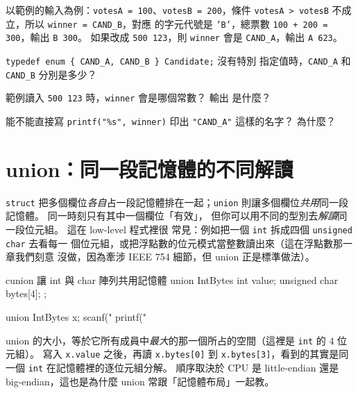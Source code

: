 
以範例的輸入為例：\texttt{votesA = 100}、\texttt{votesB = 200}，條件
\texttt{votesA > votesB} 不成立，所以 \texttt{winner = CAND\_B}，對應
的字元代號是 \texttt{'B'}，總票數 \texttt{100 + 200 = 300}，輸出
\texttt{B 300}。 如果改成 \texttt{500 123}，則 \texttt{winner} 會是
\texttt{CAND\_A}，輸出 \texttt{A 623}。


\begin{drills}[label=drills:ext-enum]
\item \texttt{typedef enum \{ CAND\_A, CAND\_B \} Candidate;} 沒有特別
指定值時，\texttt{CAND\_A} 和 \texttt{CAND\_B} 分別是多少？
\item 範例讀入 \texttt{500 123} 時，\texttt{winner} 會是哪個常數？ 輸出
是什麼？
\item 能不能直接寫 \texttt{printf("\%s", winner)} 印出 \texttt{"CAND\_A"}
這樣的名字？ 為什麼？
\end{drills}

\section{union：同一段記憶體的不同解讀}
\label{sec:ext-union}

\texttt{struct} 把多個欄位\emph{各自}占一段記憶體排在一起；\texttt{union}
則讓多個欄位\emph{共用}同一段記憶體。 同一時刻只有其中一個欄位「有效」，
但你可以用不同的型別去\emph{解讀}同一段位元組。 這在 low-level 程式裡很
常見：例如把一個 \texttt{int} 拆成四個 \texttt{unsigned char} 去看每一
個位元組，或把浮點數的位元模式當整數讀出來（這在浮點數那一章我們刻意
沒做，因為牽涉 IEEE 754 細節，但 union 正是標準做法）。

\begin{code}{c}{union 讓 int 與 char 陣列共用記憶體}
union IntBytes {
    int value;
    unsigned char bytes[4];
};

union IntBytes x;
scanf("%
printf("%
\end{code}

union 的大小，等於它所有成員中\emph{最大}的那一個所占的空間（這裡是
\texttt{int} 的 $4$ 位元組）。 寫入 \texttt{x.value} 之後，再讀
\texttt{x.bytes[0]} 到 \texttt{x.bytes[3]}，看到的其實是同一個
\texttt{int} 在記憶體裡的逐位元組分解。 順序取決於 CPU 是 little-endian
還是 big-endian，這也是為什麼 union 常跟「記憶體布局」一起教。


